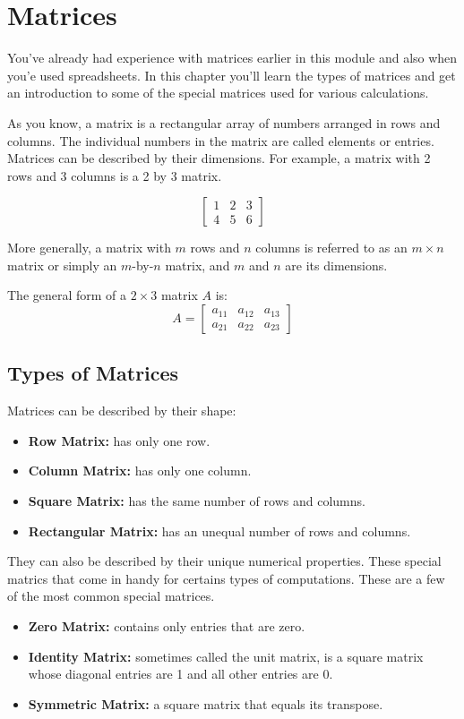 \chapter{Matrices}
You've already had experience with matrices earlier in this module and also when you'e used spreadsheets. In this chapter you'll learn the types of matrices and get an introduction to some of the special matrices used for various calculations. 

As you know, a matrix is a rectangular array of numbers arranged in rows and columns. The individual numbers in the matrix are called elements or entries. Matrices can be described by their dimensions. For example, a matrix with 2 rows and 3 columns is a 2 by 3 matrix.

$$\begin{bmatrix}
1 &2  &3\\
 4 &5  &6 
\end{bmatrix}
$$

More generally, a matrix with $m$ rows and $n$ columns is referred to as an $m \times n$ matrix or simply an $m$-by-$n$ matrix, and $m$ and $n$ are its dimensions.

The general form of a $2 \times 3$ matrix $A$ is:
$$
A = \begin{bmatrix}
a_{11} & a_{12} & a_{13} \\
a_{21} & a_{22} & a_{23}
\end{bmatrix}
$$

\section{Types of Matrices}
Matrices can be described by their shape:
\begin{itemize}
	\item \textbf{Row Matrix:} has only one row.
	\item \textbf{Column Matrix:} has only one column.
	\item \textbf{Square Matrix:} has the same number of rows and columns.
	\item \textbf{Rectangular Matrix:} has an unequal number of rows and columns.
\end{itemize}

They can also be described by their unique numerical properties. These special matrics that come in handy for certains types of computations. These are a few of the most common special matrices.
\begin{itemize}
	\item \textbf{Zero Matrix:} contains only entries that are zero.
	\item \textbf{Identity Matrix:} sometimes called the unit matrix, is a square matrix whose diagonal entries are 1 and all other entries are 0.
	\item \textbf{Symmetric Matrix:} a square matrix that equals its transpose.
\end{itemize}

